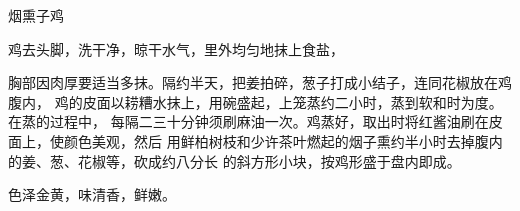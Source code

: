 \begin{recipe}{烟熏子鸡}

\ingredients


\preparation

鸡去头脚，洗干净，晾干水气，里外均匀地抹上食盐，

胸部因肉厚要适当多抹。隔约半天，把姜拍碎，葱子打成小结子，连同花椒放在鸡腹内，
鸡的皮面以耢糟水抹上，用碗盛起，上笼蒸约二小时，蒸到软和时为度。在蒸的过程中，
每隔二三十分钟须刷麻油一次。鸡蒸好，取出时将红酱油刷在皮面上，使颜色美观，然后
用鲜柏树枝和少许茶叶燃起的烟子熏约半小时去掉腹内的姜、葱、花椒等，砍成约八分长
的斜方形小块，按鸡形盛于盘内即成。

\features

色泽金黄，味清香，鲜嫩。

\end{recipe}

